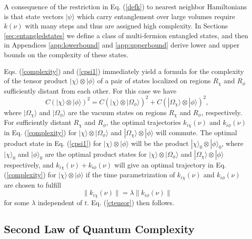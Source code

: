 \documentclass[12pt,amsmath,amssymb,onecolumn]{revtex4-2}
\begin{document}
A consequence of the restriction in Eq. (\ref{defk}) to nearest neighbor Hamiltonians is
that state vectors $|\psi \rangle $ which carry entanglement over large volumes
require $k(\nu)$ with many steps and thus
are assigned high complexity.  
In Sections \ref{sec:entangledstates} we define a class of 
multi-fermion entangled states, and then in
Appendices \ref{app:lowerbound} and \ref{app:upperbound} 
derive lower and upper bounds on the complexity of these states.

Eqs. (\ref{complexity}) and (\ref{cpsi1}) immediately yield 
a formula for the complexity of the tensor product $|\chi \rangle  \otimes |\phi \rangle $ of a pair of states
localized on regions $R_{\chi}$ and $R_{\phi}$ sufficiently distant from each other. 
For this case we have
\begin{equation}
\label{ctensor}
C( |\chi \rangle  \otimes |\phi \rangle )^2 = 
C( |\chi \rangle  \otimes |\Omega_{\phi} \rangle  )^2 + C( |\Omega_{\chi} \rangle  \otimes |\phi \rangle )^2,
\end{equation}
where $|\Omega_{\chi} \rangle $ and $|\Omega_{\phi} \rangle $ are the vacuum states on regions $R_{\chi}$
and $R_{\phi}$, respectively. For sufficiently 
distant $R_{\chi}$ and $R_{\phi}$, the optimal trajectories 
$k_{i\chi}(\nu)$ and $k_{i\phi}(\nu)$
in Eq. (\ref{complexity})
for  $|\chi \rangle  \otimes |\Omega_{\phi} \rangle $ and $|\Omega_{\chi} \rangle  \otimes |\phi \rangle $
will commute. The optimal product state in 
Eq. (\ref{cpsi1}) for $|\chi \rangle  \otimes |\phi \rangle $ will be the product
$|\chi \rangle _0 \otimes |\phi \rangle _0$, where $|\chi \rangle _0$ and $|\phi \rangle _0$
are the optimal product states for $|\chi \rangle  \otimes |\Omega_{\phi} \rangle $ and $|\Omega_{\chi} \rangle  \otimes |\phi \rangle $
respectively, and
$k_{i\chi}(\nu) + k_{i\phi}(\nu)$ will give
an optimal trajectory in Eq. (\ref{complexity}) for $|\chi \rangle  \otimes |\phi \rangle $ if the
time parametrization of 
$k_{i\chi}(\nu)$ and $k_{i\phi}(\nu)$ are chosen to fulfill
\begin{equation}
\label{fixedratio}
\parallel k_{i\chi}(\nu)\parallel = \lambda \parallel k_{i\phi}(\nu)\parallel
\end{equation}
for some $\lambda$ independent of $t$.
Eq. (\ref{ctensor}) then follows.


\subsection{\label{subsec:secondlaw} Second Law of Quantum Complexity}
\end{document}

